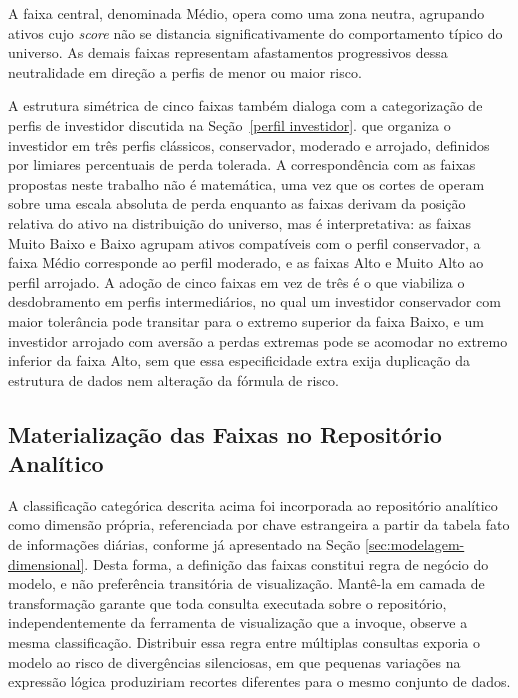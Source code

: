 
A faixa central, denominada Médio, opera como uma zona neutra, agrupando ativos cujo \textit{score} não se distancia significativamente do comportamento típico do universo. As demais faixas representam afastamentos progressivos dessa neutralidade em direção a perfis de menor ou maior risco.

A estrutura simétrica de cinco faixas também dialoga com a categorização de perfis de investidor discutida na Seção~\ref{perfil investidor}.  que organiza o investidor em três perfis clássicos, conservador, moderado e arrojado, definidos por limiares percentuais de perda tolerada. A correspondência com as faixas propostas neste trabalho não é matemática, uma vez que os cortes de  operam sobre uma escala absoluta de perda enquanto as faixas derivam da posição relativa do ativo na distribuição do universo, mas é interpretativa: as faixas Muito Baixo e Baixo agrupam ativos compatíveis com o perfil conservador, a faixa Médio corresponde ao perfil moderado, e as faixas Alto e Muito Alto ao perfil arrojado. A adoção de cinco faixas em vez de três é o que viabiliza o desdobramento em perfis intermediários, no qual um investidor conservador com maior tolerância pode transitar para o extremo superior da faixa Baixo, e um investidor arrojado com aversão a perdas extremas pode se acomodar no extremo inferior da faixa Alto, sem que essa especificidade extra exija duplicação da estrutura de dados nem alteração da fórmula de risco.

\subsection{Materialização das Faixas no Repositório Analítico}

A classificação categórica descrita acima foi incorporada ao repositório analítico como dimensão própria, referenciada por chave estrangeira a partir da tabela fato de informações diárias, conforme já apresentado na Seção \ref{sec:modelagem-dimensional}. Desta forma, a definição das faixas constitui regra de negócio do modelo, e não preferência transitória de visualização. Mantê-la em camada de transformação garante que toda consulta executada sobre o repositório, independentemente da ferramenta de visualização que a invoque, observe a mesma classificação. Distribuir essa regra entre múltiplas consultas exporia o modelo ao risco de divergências silenciosas, em que pequenas variações na expressão lógica produziriam recortes diferentes para o mesmo conjunto de dados.

